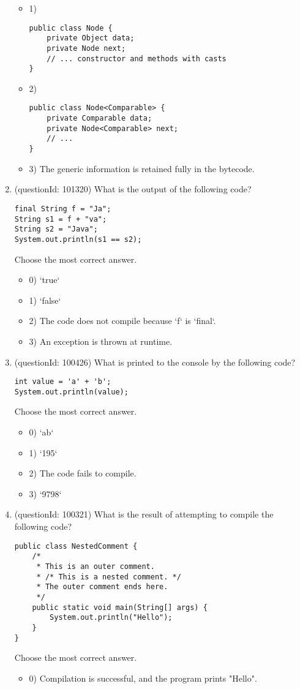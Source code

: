 \documentclass[12pt]{article}
\begin{document}
\begin{enumerate}[label=(\arabic*)]
\begin{itemize}
\item 1) \begin{verbatim}public class Node {
    private Object data;
    private Node next;
    // ... constructor and methods with casts
}\end{verbatim}

\item 2) \begin{verbatim}public class Node<Comparable> {
    private Comparable data;
    private Node<Comparable> next;
    // ...
}\end{verbatim}

\item 3) The generic information is retained fully in the bytecode.

\end{itemize}
\item (questionId: 101320) What is the output of the following code?
\begin{verbatim}
final String f = "Ja";
String s1 = f + "va";
String s2 = "Java";
System.out.println(s1 == s2);
\end{verbatim}
Choose the most correct answer. 
\begin{itemize}
\item 0) `true`

\item 1) `false`

\item 2) The code does not compile because `f` is `final`.

\item 3) An exception is thrown at runtime.

\end{itemize}
\item (questionId: 100426) What is printed to the console by the following code?
\begin{verbatim}
int value = 'a' + 'b';
System.out.println(value);
\end{verbatim}
Choose the most correct answer. 
\begin{itemize}
\item 0) `ab`

\item 1) `195`

\item 2) The code fails to compile.

\item 3) `9798`

\end{itemize}
\item (questionId: 100321) What is the result of attempting to compile the following code?
\begin{verbatim}
public class NestedComment {
    /*
     * This is an outer comment.
     * /* This is a nested comment. */
     * The outer comment ends here.
     */
    public static void main(String[] args) {
        System.out.println("Hello");
    }
}
\end{verbatim}
Choose the most correct answer. 
\begin{itemize}
\item 0) Compilation is successful, and the program prints "Hello".


\end{itemize}
\end{enumerate}
\end{document}
